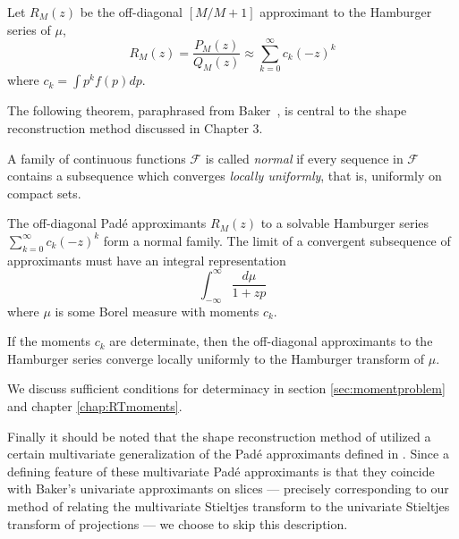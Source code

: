 Let $R_M(z)$ be the off-diagonal $[M/M+1]$ approximant to the Hamburger series of $\mu$,
\[
  R_M(z) 
  = \frac{P_M(z)}{Q_M(z)} 
  \approx \sum_{k=0}^\infty c_k {(-z)}^k 
\]
where $c_k = \int p^k f(p) dp$. 

The following theorem, paraphrased from Baker~\cite{Bake81}, is central to the shape reconstruction method discussed in Chapter 3. 

\begin{definition}
  A family of continuous functions $\mathscr{F}$ is called \emph{normal} if every sequence in $\mathscr{F}$ contains a subsequence which converges \emph{locally uniformly}, that is, uniformly on compact sets.
\end{definition}

\begin{proposition}
  The off-diagonal Pad\'e approximants $R_M(z)$ to a solvable Hamburger series $\sum_{k = 0}^\infty c_k {(-z)}^k$ form a normal family. The limit of a convergent subsequence of approximants must have an integral representation
  \[
    \int_{-\infty}^\infty \frac{d\mu}{1 + zp}
  \]
  where $\mu$ is some Borel measure with moments $c_k$.
\end{proposition}


\begin{corollary} \label{cr:determinacypade}
  If the moments $c_k$ are determinate, then the off-diagonal approximants to the Hamburger series converge locally uniformly to the Hamburger transform of $\mu$.
\end{corollary}
We discuss sufficient conditions for determinacy in section \ref{sec:momentproblem} and chapter \ref{chap:RTmoments}.

Finally it should be noted that the shape reconstruction method of \cite{Cuyt05} utilized a certain multivariate generalization of the Pad\'e approximants defined in \cite{Cuyt84}. Since a defining feature of these multivariate Pad\'e approximants is that they coincide with Baker's univariate approximants on slices — precisely corresponding to our method of relating the multivariate Stieltjes transform to the univariate Stieltjes transform of projections — we choose to skip this description.

